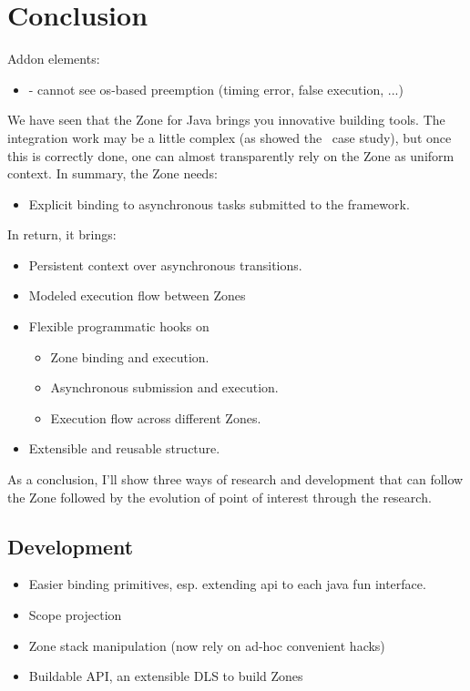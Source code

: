 
\chapter{Conclusion}
\label{ch:conclusion}


Addon elements:
\begin{itemize}
\item - cannot see os-based preemption (timing error, false execution, ...)
\end{itemize}

We have seen that the Zone for Java brings you innovative building tools. The integration work may be a little complex (as showed the \vertx\ case study), but once this is correctly done, one can almost transparently rely on the Zone as uniform context. In summary, the Zone needs:
\begin{itemize}
\item Explicit binding to asynchronous tasks submitted to the framework.
\end{itemize}

In return, it brings:
\begin{itemize}
\item Persistent context over asynchronous transitions.
\item Modeled execution flow between Zones
\item Flexible programmatic hooks on
  \begin{itemize}
  \item Zone binding and execution.
  \item Asynchronous submission and execution.
  \item Execution flow across different Zones.
  \end{itemize}
\item Extensible and reusable structure.
\end{itemize}

As a conclusion, I'll show three ways of research and development that can follow the Zone followed by the evolution of point of interest through the research.

\section{Development}

\begin{itemize}
\item Easier binding primitives, esp. extending api to each java fun interface.
\item Scope projection
\item Zone stack manipulation (now rely on ad-hoc convenient hacks)
\item Buildable API, an extensible DLS to build Zones
\end{itemize}

